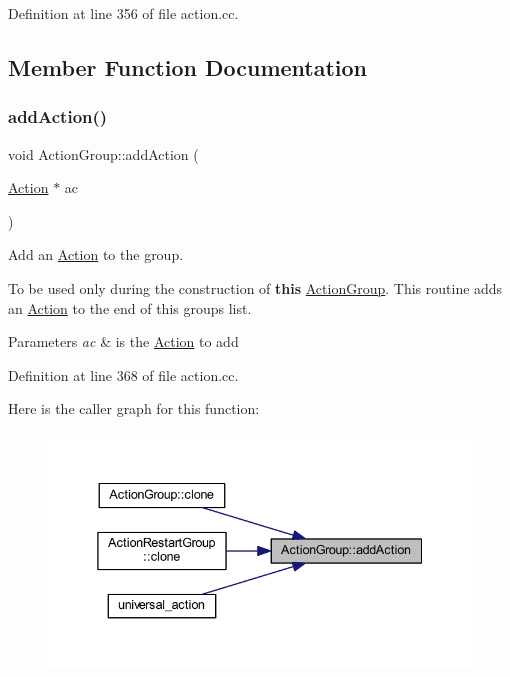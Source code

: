 Definition at line 356 of file action.\+cc.



\subsection{Member Function Documentation}
\mbox{\label{class_action_group_a868ae1f92d3369b22075d337b8681ffe}} 
\subsubsection{\texorpdfstring{addAction()}{addAction()}}
{\footnotesize\ttfamily void Action\+Group\+::add\+Action (\begin{DoxyParamCaption}\item[{\mbox{\hyperlink{class_action}{Action}} $\ast$}]{ac }\end{DoxyParamCaption})}



Add an \mbox{\hyperlink{class_action}{Action}} to the group. 

To be used only during the construction of {\bfseries{this}} \mbox{\hyperlink{class_action_group}{Action\+Group}}. This routine adds an \mbox{\hyperlink{class_action}{Action}} to the end of this group\textquotesingle{}s list. 
\begin{DoxyParams}{Parameters}
{\em ac} & is the \mbox{\hyperlink{class_action}{Action}} to add \\
\hline
\end{DoxyParams}


Definition at line 368 of file action.\+cc.

Here is the caller graph for this function\+:
\nopagebreak
\begin{figure}[H]
\begin{center}
\leavevmode
\includegraphics[width=338pt]{class_action_group_a868ae1f92d3369b22075d337b8681ffe_icgraph}
\end{center}
\end{figure}
\mbox{\label{class_action_group_aaaab0b0f5c7a14752cd57478de2e9290}} 
